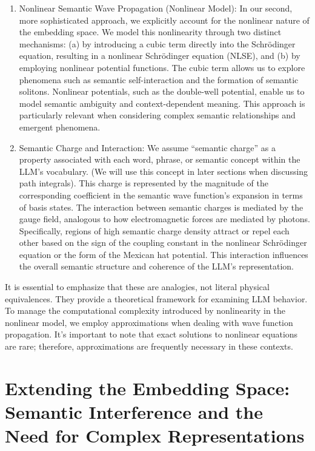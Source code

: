 \documentclass[prd,amsmath,amssymb,12pt]{revtex4}
\begin{document}
\begin{enumerate}
    \item Nonlinear Semantic Wave Propagation (Nonlinear Model): In our second, more sophisticated approach, we
    explicitly account for the nonlinear nature of the embedding space. We model this nonlinearity through two
    distinct mechanisms: (a) by introducing a cubic term directly into the Schrödinger equation, resulting in a
    nonlinear Schrödinger equation (NLSE), and (b) by employing nonlinear potential functions. The cubic term allows
    us to explore phenomena such as semantic self-interaction and the formation of semantic solitons. Nonlinear
    potentials, such as the double-well potential, enable us to model semantic ambiguity and context-dependent
    meaning. This approach is particularly relevant when considering complex semantic relationships and emergent phenomena.

    \item Semantic Charge and Interaction: We assume ``semantic charge'' as a property associated with
    each word, phrase, or semantic concept within the LLM's vocabulary. (We will use this
    concept in later sections when discussing path integrals).
    This charge is represented
    by the magnitude of the corresponding coefficient in the semantic wave function's expansion
    in terms of basis states. The interaction between semantic charges is mediated by the gauge
    field, analogous to how electromagnetic forces are mediated by photons. Specifically, regions
    of high semantic charge density attract or repel each other based on the sign of the coupling
    constant in the nonlinear Schrödinger equation or the form of the Mexican hat potential.
    This interaction influences the overall semantic structure and coherence of the LLM's representation.


\end{enumerate}

\noindent
It is essential to emphasize that these
are analogies, not literal physical equivalences.
They provide a theoretical framework for examining LLM behavior.
To manage the computational complexity introduced by nonlinearity in the nonlinear model, we employ approximations
when dealing with wave function propagation. It's important to note that exact solutions to nonlinear equations
are rare; therefore, approximations are frequently necessary in these contexts.


\section{Extending the Embedding Space: Semantic Interference and the Need for Complex Representations}
\end{document}
